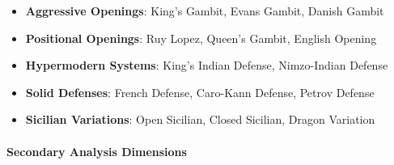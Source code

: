 \documentclass[
]{article}
\providecommand{\tightlist}{%
  \setlength{\itemsep}{0pt}\setlength{\parskip}{0pt}}
\begin{document}
\begin{enumerate}
  \begin{itemize}
  \tightlist
  \item
    \textbf{Aggressive Openings}: King's Gambit, Evans Gambit, Danish
    Gambit
  \item
    \textbf{Positional Openings}: Ruy Lopez, Queen's Gambit, English
    Opening
  \item
    \textbf{Hypermodern Systems}: King's Indian Defense, Nimzo-Indian
    Defense
  \item
    \textbf{Solid Defenses}: French Defense, Caro-Kann Defense, Petrov
    Defense
  \item
    \textbf{Sicilian Variations}: Open Sicilian, Closed Sicilian, Dragon
    Variation
  \end{itemize}
\end{enumerate}

\paragraph{Secondary Analysis
Dimensions}\label{secondary-analysis-dimensions}
\end{document}
